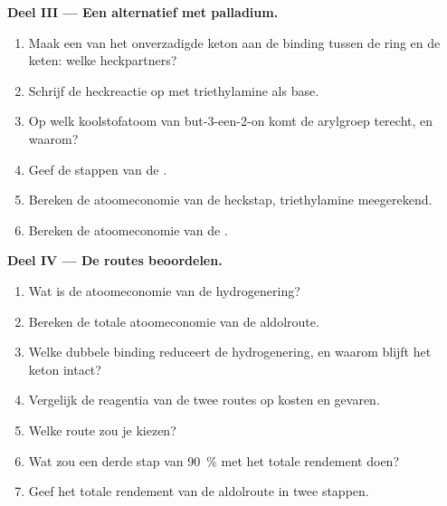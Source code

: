 \begin{problem}
\medskip
\noindent\textbf{Deel III --- Een alternatief met palladium.}
\begin{enumerate}[resume]
  \item Maak een  van het onverzadigde keton aan de binding tussen de ring en de keten: welke
        heckpartners?
  \item Schrijf de heckreactie op met triethylamine als base.
  \item Op welk koolstofatoom van but-3-een-2-on komt de arylgroep terecht, en waarom?
  \item Geef de stappen van de .
  \item Bereken de atoomeconomie van de heckstap, triethylamine meegerekend.
  \item Bereken de atoomeconomie van de .
\end{enumerate}

\medskip
\noindent\textbf{Deel IV --- De routes beoordelen.}
\begin{enumerate}[resume]
  \item Wat is de atoomeconomie van de hydrogenering?
  \item Bereken de totale atoomeconomie van de aldolroute.
  \item Welke dubbele binding reduceert de hydrogenering, en waarom blijft het keton intact?
  \item Vergelijk de reagentia van de twee routes op kosten en gevaren.
  \item Welke route zou je kiezen?
  \item Wat zou een derde stap van 90~\% met het totale rendement doen?
  \item Geef het totale rendement van de aldolroute in twee stappen.
\end{enumerate}
\end{problem}
